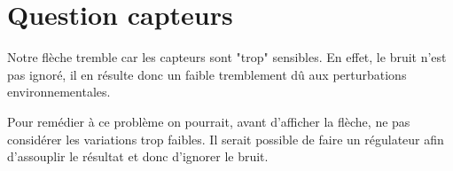 \documentclass[12pt]{article}
\begin{document}
\section*{Question capteurs}

Notre flèche tremble car les capteurs sont "trop" sensibles. En effet, le bruit n'est pas ignoré, il en résulte donc un faible tremblement dû aux perturbations environnementales.

Pour remédier à ce problème on pourrait, avant d'afficher la flèche, ne pas considérer les variations trop faibles. Il serait possible de faire un régulateur afin d'assouplir le résultat et donc d'ignorer le bruit.
\end{document}
